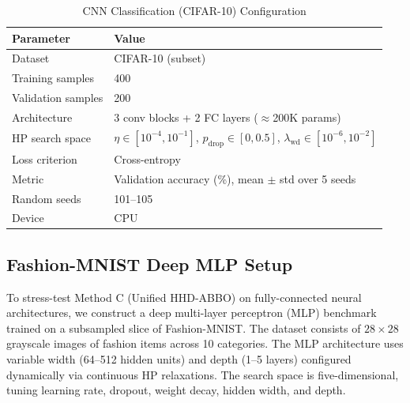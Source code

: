 \documentclass[11pt]{article}
\theoremstyle{definition}
\begin{document}
\begin{table}[H]
\centering
\caption{CNN Classification (CIFAR-10) Configuration}
\label{tab:cnn_setup}
\renewcommand{\arraystretch}{1.2}
\begin{tabular}{ll}
\toprule
Parameter & Value \\
\midrule
Dataset              & CIFAR-10 (subset) \\
Training samples     & 400 \\
Validation samples   & 200 \\
Architecture         & 3 conv blocks + 2 FC layers ($\approx$200K params) \\
HP search space      & $\eta\in[10^{-4},10^{-1}]$,
                       $p_{\mathrm{drop}}\in[0,0.5]$,
                       $\lambda_{\mathrm{wd}}\in[10^{-6},10^{-2}]$ \\
Loss criterion       & Cross-entropy \\
Metric               & Validation accuracy (\%), mean $\pm$ std over 5 seeds \\
Random seeds         & 101--105 \\
Device               & CPU \\
\bottomrule
\end{tabular}
\end{table}

\subsection{Fashion-MNIST Deep MLP Setup}

To stress-test Method C (Unified HHD-ABBO) on fully-connected neural architectures, we construct a deep multi-layer perceptron (MLP) benchmark trained on a subsampled slice of Fashion-MNIST. The dataset consists of $28{\times}28$ grayscale images of fashion items across 10 categories. The MLP architecture uses variable width (64--512 hidden units) and depth (1--5 layers) configured dynamically via continuous HP relaxations. The search space is five-dimensional, tuning learning rate, dropout, weight decay, hidden width, and depth.
\end{document}
